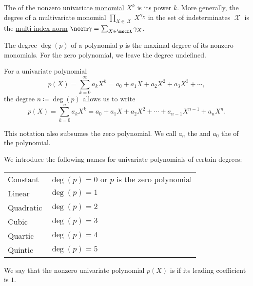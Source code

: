 \begin{definition}\label{def:polynomial_degree}
  The  of the nonzero univariate \hyperref[def:polynomial_algebra]{monomial} \( X^k \) is its power \( k \). More generally, the degree of a multivariate monomial \( \prod_{X \in \mscrX} X^{\gamma_X} \) in the set of indeterminates \( \mscrX \) is the \hyperref[def:multi_index]{multi-index norm} \( \norm \gamma = \sum_{X \in \mscrX} \gamma_X \).

  The degree \( \deg(p) \) of a polynomial \( p \) is the maximal degree of its nonzero monomials. For the zero polynomial, we leave the degree undefined.

  For a univariate polynomial
  \begin{equation*}
    p(X) = \sum_{k=0}^\infty a_k X^k = a_0 + a_1 X + a_2 X^2 + a_3 X^3 + \cdots,
  \end{equation*}
  the degree \( n \coloneqq \deg(p) \) allows us to write
  \begin{equation*}
    p(X) = \sum_{k=0}^n a_k X^k = a_0 + a_1 X + a_2 X^2 + \cdots + a_{n-1} X^{n-1} + a_n X^n.
  \end{equation*}

  This notation also subsumes the zero polynomial. We call \( a_n \) the  and \( a_0 \) the  of the polynomial.

  We introduce the following names for univariate polynomials of certain degrees:
  \begin{center}
    \begin{tabular}{l | l}
      Constant  & \( \deg(p) = 0 \) or \( p \) is the zero polynomial \\
      Linear    & \( \deg(p) = 1 \)                                   \\
      Quadratic & \( \deg(p) = 2 \)                                   \\
      Cubic     & \( \deg(p) = 3 \)                                   \\
      Quartic   & \( \deg(p) = 4 \)                                   \\
      Quintic   & \( \deg(p) = 5 \)
    \end{tabular}
  \end{center}
\end{definition}

\begin{definition}\label{def:monic_polynomial}
  We say that the nonzero univariate polynomial \( p(X) \) is  if its leading coefficient is \( 1 \).
\end{definition}


